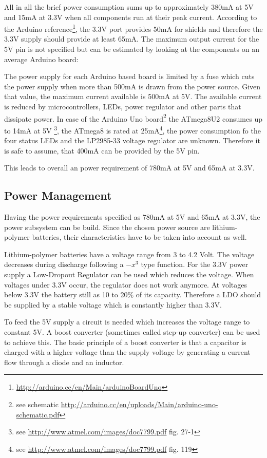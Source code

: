 \documentclass[11pt,a4paper]{article}
\begin{document}
All in all the brief power consumption sums up to approximately 380mA at 5V and 15mA at 3.3V when all components run at their peak current. According to the Arduino reference\footnote{\url{http://arduino.cc/en/Main/arduinoBoardUno}}, the 3.3V port provides 50mA for shields and therefore the 3.3V supply should provide at least 65mA. The maximum output current for the 5V pin is not specified but can be estimated by looking at the components on an average Arduino board:

The power supply for each Arduino based board is limited by a fuse which cuts the power supply when more than 500mA is drawn from the power source. Given that value, the maximum current available is 500mA at 5V. The available current is reduced by microcontrollers, LEDs, power regulator and other parts that dissipate power. In case of the Arduino Uno board\footnote{see schematic \url{http://arduino.cc/en/uploads/Main/arduino-uno-schematic.pdf}} the ATmega8U2 consumes up to 14mA at 5V \footnote{see \url{http://www.atmel.com/images/doc7799.pdf} fig. 27-1}, the ATmega8 is rated at 25mA\footnote{see \url{http://www.atmel.com/images/doc7799.pdf} fig. 119}, the power consumption fo the four status LEDs and the LP2985-33 voltage regulator are unknown. Therefore it is safe to assume, that 400mA can be provided by the 5V pin.

This leads to overall an power requirement of 780mA at 5V and 65mA at 3.3V.

\subsection{Power Management}
Having the power requirements specified as 780mA at 5V and 65mA at 3.3V, the power subsystem can be build.  Since the chosen power source are lithium-polymer batteries, their characteristics have to be taken into account as well.

Lithium-polymer batteries have a voltage range from 3 to 4.2 Volt. The voltage decreases during discharge following a $-x^3$ type function. For the 3.3V power supply a Low-Dropout Regulator can be used which reduces the voltage. When voltages under 3.3V occur, the regulator does not work anymore. At voltages below 3.3V the battery still as 10 to 20\% of its capacity. Therefore a LDO should be supplied by a stable voltage which is constantly higher than 3.3V.

To feed the 5V supply a circuit is needed which increases the voltage range to constant 5V. A boost converter (sometimes called step-up converter) can be used to achieve this. The basic principle of a boost converter is that a capacitor is charged with a higher voltage than the supply voltage by generating a current flow through a diode and an inductor. 
\end{document}
